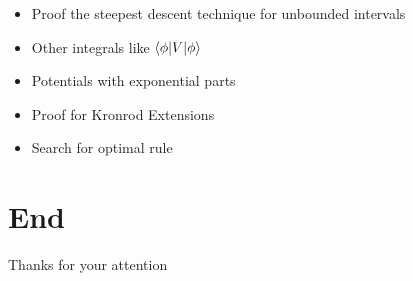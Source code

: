 \documentclass{beamer}
\begin{document}
\begin{frame}
  \begin{itemize}
    \item Proof the steepest descent technique for unbounded intervals
    \item Other integrals like $\braket{\phi|V|\phi}$
    \item Potentials with exponential parts
    \item Proof for Kronrod Extensions
    \item Search for optimal rule
  \end{itemize}
\end{frame}


\section{End}

\begin{frame}{Thanks for your attention}
  \scriptsize
  
  
\end{frame}
\end{document}
